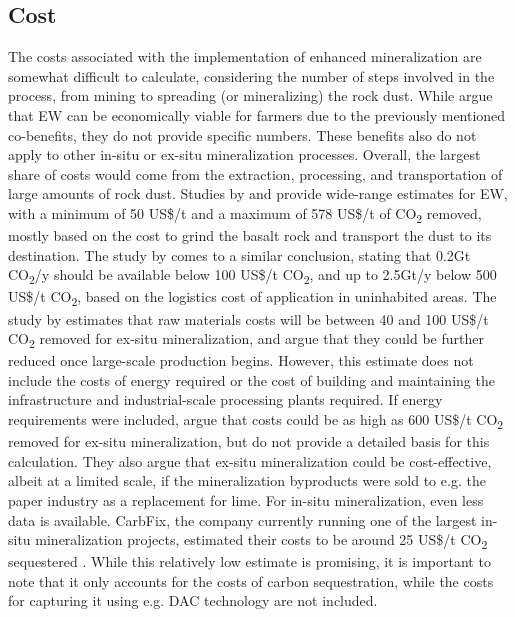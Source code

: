 \subsection*{Cost}
The costs associated with the implementation of enhanced mineralization are somewhat difficult to calculate, considering the number of steps involved in the process, from mining to spreading (or mineralizing) the rock dust. While \textcite{Almaraz2022MethodsSettings} argue that EW can be economically viable for farmers due to the previously mentioned co-benefits, they do not provide specific numbers. These benefits also do not apply to other in-situ or ex-situ mineralization processes. Overall, the largest share of costs would come from the extraction, processing, and transportation of large amounts of rock dust. Studies by \textcite{Beerling2018FarmingSecurity} and \textcite{Fuss2018NegativeEffects} provide wide-range estimates for EW, with a minimum of 50 US\$/t and a maximum of 578 US\$/t of CO\textsubscript{2} removed, mostly based on the cost to grind the basalt rock and transport the dust to its destination. The study by \textcite{Goll2021PotentialRock} comes to a similar conclusion, stating that 0.2Gt CO\textsubscript{2}/y should be available below 100 US\$/t CO\textsubscript{2}, and up to 2.5Gt/y below 500 US\$/t CO\textsubscript{2}, based on the logistics cost of application in uninhabited areas.
The study by \textcite{Lackner1997ProgressSubstrates} estimates that raw materials costs will be between 40 and 100 US\$/t CO\textsubscript{2} removed for ex-situ mineralization, and argue that they could be further reduced once large-scale production begins. However, this estimate does not include the costs of energy required or the cost of building and maintaining the infrastructure and industrial-scale processing plants required. If energy requirements were included, \textcite{Lawler2021CarbonMineralization} argue that costs could be as high as 600 US\$/t CO\textsubscript{2} removed for ex-situ mineralization, but do not provide a detailed basis for this calculation. They also argue that ex-situ mineralization could be cost-effective, albeit at a limited scale, if the mineralization byproducts were sold to e.g. the paper industry as a replacement for lime. For in-situ mineralization, even less data is available. CarbFix, the company currently running one of the largest in-situ mineralization projects, estimated their costs to be around 25 US\$/t CO\textsubscript{2} sequestered \parencite{Lawler2021CarbonMineralization}. While this relatively low estimate is promising, it is important to note that it only accounts for the costs of carbon sequestration, while the costs for capturing it using e.g. DAC technology are not included.
